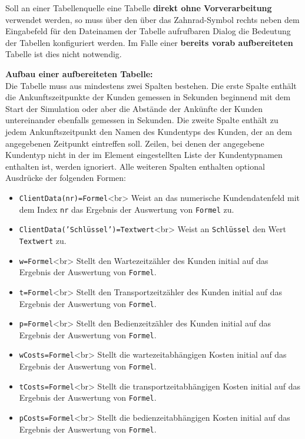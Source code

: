 Soll an einer Tabellenquelle eine Tabelle \textbf{direkt ohne Vorverarbeitung}
verwendet werden, so muss über den über das Zahnrad-Symbol rechts neben dem Eingabefeld
für den Dateinamen der Tabelle aufrufbaren Dialog die Bedeutung der Tabellen konfiguriert werden.
Im Falle einer \textbf{bereits vorab aufbereiteten} Tabelle ist dies nicht notwendig.

\textbf{Aufbau einer aufbereiteten Tabelle:}~\\
Die Tabelle muss aus mindestens zwei Spalten bestehen. Die erste Spalte enthält die Ankunftszeitpunkte
der Kunden gemessen in Sekunden beginnend mit dem Start der Simulation oder aber die Abstände
der Ankünfte der Kunden untereinander ebenfalls gemessen in Sekunden. Die zweite Spalte
enthält zu jedem Ankunftszeitpunkt den Namen des Kundentyps des Kunden, der an dem
angegebenen Zeitpunkt eintreffen soll. Zeilen, bei denen der angegebene Kundentyp
nicht in der im Element eingestellten Liste der Kundentypnamen enthalten ist, werden ignoriert.
Alle weiteren Spalten enthalten optional Ausdrücke der folgenden Formen:

\begin{itemize}
  \item \texttt{ClientData(nr)=Formel}<br>
  Weist an das numerische Kundendatenfeld mit dem Index \texttt{nr} das Ergebnis der
  Auswertung von \texttt{Formel} zu. 
  \item \texttt{ClientData('Schlüssel')=Textwert}<br>
  Weist an \texttt{Schlüssel} den Wert \texttt{Textwert} zu. 
  \item \texttt{w=Formel}<br>
  Stellt den Wartezeitzähler des Kunden initial auf das Ergebnis der
  Auswertung von \texttt{Formel}.   
  \item \texttt{t=Formel}<br>
  Stellt den Transportzeitzähler des Kunden initial auf das Ergebnis der
  Auswertung von \texttt{Formel}. 
  \item \texttt{p=Formel}<br>
  Stellt den Bedienzeitzähler des Kunden initial auf das Ergebnis der
  Auswertung von \texttt{Formel}. 
  \item \texttt{wCosts=Formel}<br>
  Stellt die wartezeitabhängigen Kosten initial auf das Ergebnis der
  Auswertung von \texttt{Formel}. 
  \item \texttt{tCosts=Formel}<br>
  Stellt die transportzeitabhängigen Kosten initial auf das Ergebnis der
  Auswertung von \texttt{Formel}. 
  \item \texttt{pCosts=Formel}<br>
  Stellt die bedienzeitabhängigen Kosten initial auf das Ergebnis der
  Auswertung von \texttt{Formel}. 
\end{itemize}

